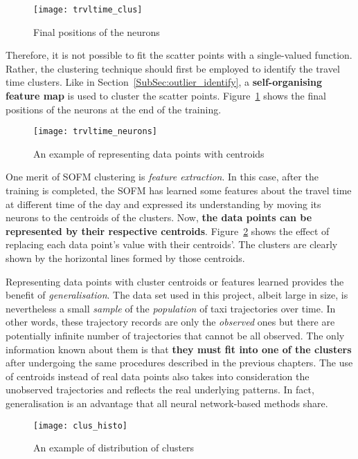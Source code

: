 \begin{figure}[h!]
\centering
\texttt{[image: trvltime\_clus]} 
\caption{Final positions of the neurons}\label{Fig:trvltime_clus}
\end{figure}

Therefore, it is not possible to fit the scatter points with a single-valued function. Rather, the clustering technique should first be employed to identify the travel time clusters. Like in Section~\ref{SubSec:outlier_identify}, a \textbf{self-organising feature map} is used to cluster the scatter points. Figure~\ref{Fig:trvltime_clus} shows the final positions of the neurons at the end of the training.

\begin{figure}[h!]
\texttt{[image: trvltime\_neurons]}
\centering
\caption{An example of representing data points with centroids}\label{Fig:trvltime_neurons}
\end{figure}

One merit of SOFM clustering is \emph{feature extraction}. In this case, after the training is completed, the SOFM has learned some features about the travel time at different time of the day and expressed its understanding by moving its neurons to the centroids of the clusters. Now, \textbf{the data points can be represented by their respective centroids}. Figure~\ref{Fig:trvltime_neurons} shows the effect of replacing each data point's value with their centroids'. The clusters are clearly shown by the horizontal lines formed by those centroids. 

Representing data points with cluster centroids or features learned provides the benefit of \emph{generalisation}. The data set used in this project, albeit large in size, is nevertheless a small \emph{sample} of the \emph{population} of taxi trajectories over time. In other words, these trajectory records are only the \emph{observed} ones but there are potentially infinite number of trajectories that cannot be all observed. The only information known about them is that \textbf{they must fit into one of the clusters} after undergoing the same procedures described in the previous chapters. The use of centroids instead of real data points also takes into consideration the unobserved trajectories and reflects the real underlying patterns. In fact, generalisation is an advantage that all neural network-based methods share. 

\begin{figure}[h!]
\texttt{[image: clus\_histo]}
\centering
\caption{An example of distribution of clusters}\label{Fig:clus_histo}
\end{figure}

